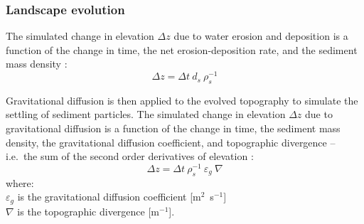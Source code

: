 \documentclass[gmd, manuscript]{copernicus}
\begin{document}

\subsubsection{Landscape evolution}

The simulated change in elevation $\Delta z$
due to water erosion and deposition
is a function of
the change in time, the net erosion-deposition rate, and the sediment mass density 
\citep{Mitasova2013}:
\begin{equation}
\label{eq:evolution} 
{\Delta z = \Delta t ~ d_s ~ \rho_s^{-1} }
\end{equation}




\noindent
Gravitational diffusion is then applied to the evolved topography
to simulate the settling of sediment particles. 
The simulated change in elevation $\Delta z$ %
due to gravitational diffusion 
is a function of the change in time, the sediment mass density, 
the gravitational diffusion coefficient, and topographic divergence 
-- i.e.~the sum of the second order derivatives of elevation
\citep{thaxton2004}:
\begin{equation}
\label{eq:grav_diffusion} 
{\Delta z = \Delta t ~ \rho_s^{-1} ~ \varepsilon_g ~ \nabla}
\end{equation}
{\small
\noindent
where: \\
\noindent
\hspace*{0.5em} $\varepsilon_g$ is the gravitational diffusion coefficient [\unit{m}$^{2}$~\unit{s}$^{-1}$]\\ \hspace*{0.5em} $\nabla$ is the topographic divergence [\unit{m}$^{-1}$].\\
}
\end{document}
